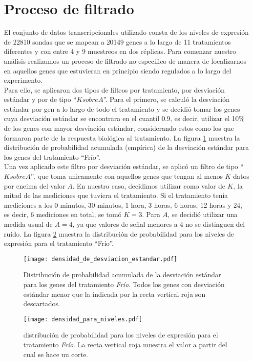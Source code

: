 \section{Proceso de filtrado}
El conjunto de datos transcripcionales utilizado consta de los niveles de expresión de 22810 sondas que se mapean a 20149 genes a lo largo de 11 tratamientos diferentes y con entre 4 y 9 muestreos en dos réplicas. Para comenzar nuestro análisis realizamos un proceso de filtrado no-especifico de manera de focalizarnos en aquellos genes que estuvieran en principio siendo regulados a lo largo del experimento.\\
Para ello, se aplicaron dos tipos de filtros por tratamiento, por desviación estándar y por de tipo ``$K sobre A$''. Para el primero, se calculó la desviación estándar por gen a lo largo de todo el tratamiento y se decidió tomar los genes cuya desviación estándar se encontrara en el cuantil 0.9, es decir, utilizar el 10\% de los genes con mayor desviación estándar, considerando estos como los que formaron parte de la respuesta biológica al tratamiento. La figura \ref{fig:densidad_de_desviacion_estandar} muestra la distribución de probabilidad acumulada (empírica) de la desviación estándar para los genes del tratamiento ``Frío''.\\
Una vez aplicado este filtro por desviación estándar, se aplicó un filtro de tipo ``$K sobre A$'', que toma unicamente con aquellos genes que tengan al menos $K$ datos por encima del valor $A$. En nuestro caso, decidimos utilizar como valor de $K$, la mitad de las mediciones que tuviera el tratamiento. Si el tratamiento tenía mediciones a los 0 minutos, 30 minutos, 1 hora, 3 horas, 6 horas, 12 horas y 24, es decir, 6 mediciones en total, se tomó $K = 3$. Para $A$, se decidió utilizar una medida usual de $A=4$, ya que valores de señal menores a $4$ no se distinguen del ruido. La figura \ref{fig:densidad_para_niveles} muestra la distribución de probabilidad para los niveles de expresión para el tratamiento ``Frío''.
\begin{figure*}[t!]
    \centering
    \begin{subfigure}[t]{0.45\textwidth}
    \centering
    \texttt{[image: densidad\_de\_desviacion\_estandar.pdf]}
    \caption{Distribución de probabilidad acumulada de la desviación estándar para los genes del tratamiento \textit{Frío}. Todos los genes con desviación estándar menor que la indicada por la recta vertical roja son descartados.}
    \label{fig:densidad_de_desviacion_estandar}
    \end{subfigure}
    \begin{subfigure}[t]{0.45\textwidth}
    \centering
    \texttt{[image: densidad\_para\_niveles.pdf]}
    \caption{distribución de probabilidad para los niveles de expresión para el tratamiento \textit{Frío}. La recta vertical roja muestra el valor a partir del cual se hace un corte.}
    \label{fig:densidad_para_niveles}
    \end{subfigure}
    \caption{Funciones de distribución de probabilidad para perfiles de expresión}
\end{figure*}
